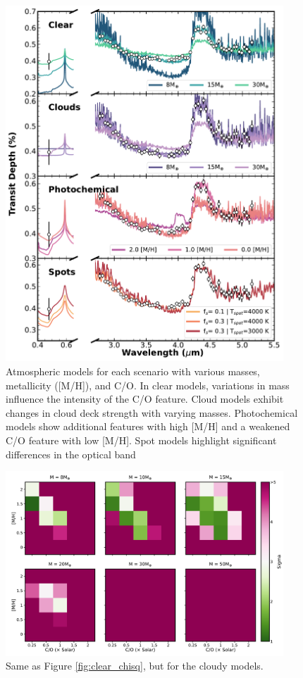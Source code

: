 \documentclass[twocolumn]{aastex63} %
\begin{document}
\begin{figure}[ht]
    \centering
    \includegraphics[width=0.93\textwidth]{all_models_cut.pdf}
    \caption{Atmospheric models for each scenario with various masses, metallicity ([M/H]), and C/O.  In clear models, variations in mass influence the intensity of the C/O feature. Cloud models exhibit changes in cloud deck strength with varying masses. Photochemical models show additional features with high [M/H] and a weakened C/O feature with low [M/H]. Spot models highlight significant differences in the optical band} 
    \label{fig:model_ts}
\end{figure}

\begin{figure}[ht]
    \centering
    \includegraphics[width=0.93\textwidth]{fig_sigma_hip67522b_newdata_cld_60k_NoOutlier.pdf}
    \caption{Same as Figure \ref{fig:clear_chisq}, but for the cloudy models.}
    \label{fig:cloud_chisq}
\end{figure}
\end{document}
